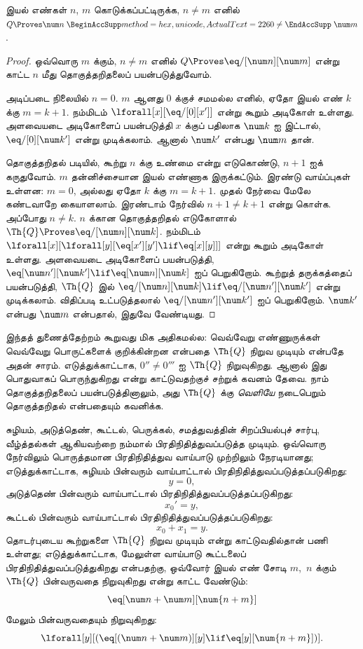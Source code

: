 \documentclass[11pt,a4paper,openany]{memoir}
\begin{document}
\begin{lem}
இயல் எண்கள் $n$, $m$ கொடுக்கப்பட்டிருக்க, $n \neq m$ எனில்
$Q \Proves \num n \neq \num m$.
\end{lem}

\begin{proof}
ஒவ்வொரு $m$ க்கும், $n \neq m$ எனில்
$Q \Proves \eq/[\num n][\num m]$ என்று காட்ட $n$ மீது
தொகுத்தறிதலைப் பயன்படுத்துவோம்.

அடிப்படை நிலையில் $n = 0$. $m$ ஆனது $0$ க்குச் சமமல்ல எனில், ஏதோ
இயல் எண் $k$ க்கு $m = k + 1$. நம்மிடம்
$\lforall[x][\eq/[0][x']]$ என்று கூறும் அடிகோள் உள்ளது.
அளவையடை அடிகோளைப் பயன்படுத்தி $x$ க்குப் பதிலாக $\num k$ ஐ இட்டால்,
$\eq/[0][\num k']$ என்று முடிக்கலாம். ஆனால் $\num k'$ என்பது
$\num m$ தான்.

தொகுத்தறிதல் படியில், கூற்று $n$ க்கு உண்மை என்று எடுகொண்டு,
$n+1$ ஐக் கருதுவோம். $m$ தன்னிச்சையான இயல் எண்ணாக இருக்கட்டும்.
இரண்டு வாய்ப்புகள் உள்ளன: $m = 0$, அல்லது ஏதோ $k$ க்கு
$m = k+1$. முதல் நேர்வை மேலே கண்டவாறே கையாளலாம். இரண்டாம் நேர்வில்
$n+1 \neq k+1$ என்று கொள்க. அப்போது $n \neq k$.
$n$ க்கான தொகுத்தறிதல் எடுகோளால்
$\Th{Q} \Proves \eq/[\num n][\num k]$. நம்மிடம்
$\lforall[x][\lforall[y][\eq[x'][y'] \lif \eq[x][y]]]$
என்று கூறும் அடிகோள் உள்ளது. அளவையடை அடிகோளைப் பயன்படுத்தி,
$\eq[\num n'][\num k'] \lif \eq[\num n][\num
  k]$ ஐப் பெறுகிறோம். கூற்றுத் தருக்கத்தைப் பயன்படுத்தி,
$\Th{Q}$ இல்
$\eq/[\num n][\num k] \lif \eq/[\num n'][\num k']$
என்று முடிக்கலாம். விதிப்படி உட்படுத்தலால்
$\eq/[\num n'][\num k']$ ஐப் பெறுகிறோம். $\num k'$ என்பது
$\num m$ என்பதால், இதுவே வேண்டியது.
\end{proof}

இந்தத் துணைத்தேற்றம் கூறுவது மிக அதிகமல்ல: வெவ்வேறு எண்ணுருக்கள்
வெவ்வேறு பொருட்களைக் குறிக்கின்றன என்பதை $\Th{Q}$ நிறுவ முடியும்
என்பதே அதன் சாரம். எடுத்துக்காட்டாக, $0'' \neq 0'''$ ஐ
$\Th{Q}$ நிறுவுகிறது. ஆனால் இது பொதுவாகப் பொருந்துகிறது என்று
காட்டுவதற்குச் சற்றுக் கவனம் தேவை. நாம் தொகுத்தறிதலைப் பயன்படுத்தினாலும்,
அது $\Th{Q}$ க்கு \emph{வெளியே} நடைபெறும் தொகுத்தறிதல் என்பதையும்
கவனிக்க.

சுழியம், அடுத்தெண், கூட்டல், பெருக்கல், சமத்துவத்தின் சிறப்பியல்புச்
சார்பு, வீழ்த்தல்கள் ஆகியவற்றை நம்மால் பிரதிநிதித்துவப்படுத்த முடியும்.
ஒவ்வொரு நேர்விலும் பொருத்தமான பிரதிநிதித்துவ வாய்பாடு முற்றிலும்
நேரடியானது; எடுத்துக்காட்டாக, சுழியம் பின்வரும் வாய்பாட்டால்
பிரதிநிதித்துவப்படுத்தப்படுகிறது:
\[
y = 0,
\]
அடுத்தெண் பின்வரும் வாய்பாட்டால் பிரதிநிதித்துவப்படுத்தப்படுகிறது:
\[
x_0' = y,
\]
கூட்டல் பின்வரும் வாய்பாட்டால் பிரதிநிதித்துவப்படுத்தப்படுகிறது:
\[
x_0 + x_1 = y.
\]
தொடர்புடைய கூற்றுகளை $\Th{Q}$ நிறுவ முடியும் என்று காட்டுவதில்தான்
பணி உள்ளது; எடுத்துக்காட்டாக, மேலுள்ள வாய்பாடு கூட்டலைப்
பிரதிநிதித்துவப்படுத்துகிறது என்பதற்கு, ஒவ்வோர் இயல் எண் சோடி
$m$,~$n$ க்கும் $\Th{Q}$ பின்வருவதை நிறுவுகிறது என்று காட்ட வேண்டும்:
\[
\eq[\num n + \num m][\num {n+m}]
\]
மேலும் பின்வருவதையும் நிறுவுகிறது:
\[
\lforall[y][(\eq[(\num n + \num m)][y] \lif \eq[y][\num {n+m}])].
\]
\end{document}
